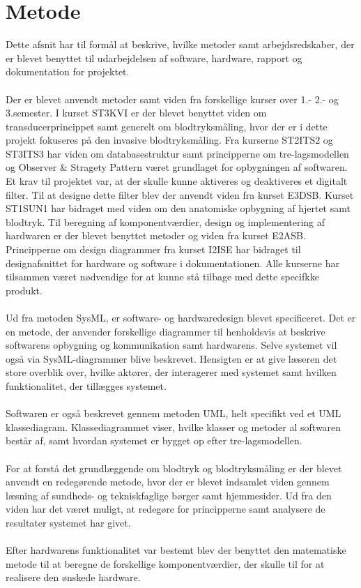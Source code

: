 \section{Metode}
Dette afsnit har til formål at beskrive, hvilke metoder samt arbejdsredskaber, der er blevet benyttet til udarbejdelsen af software, hardware, rapport og dokumentation for projektet. 
\\\\
Der er blevet anvendt metoder samt viden fra forskellige kurser over 1.- 2.- og 3.semester. I kurset ST3KVI er der blevet benyttet viden om transducerprincippet samt generelt om blodtryksmåling, hvor der er i dette projekt fokuseres på den invasive blodtryksmåling. Fra kurserne ST2ITS2 og ST3ITS3 har viden om databasestruktur samt principperne om tre-lagsmodellen og Observer \& Stragety Pattern været grundlaget for opbygningen af softwaren. Et krav til projektet var, at der skulle kunne aktiveres og deaktiveres et digitalt filter. Til at designe dette filter blev der anvendt viden fra kurset E3DSB. Kurset ST1SUN1 har bidraget med viden om den anatomiske opbygning af hjertet samt blodtryk. Til beregning af komponentværdier, design og implementering af hardwaren er der blevet benyttet metoder og viden fra kurset E2ASB. Principperne om design diagrammer fra kurset I2ISE har bidraget til designafsnittet for hardware og software i dokumentationen. Alle kurserne har tilsammen været nødvendige for at kunne stå tilbage med dette specifkke produkt.
\\\\
Ud fra metoden SysML, er software- og hardwaredesign blevet specificeret. Det er en metode, der anvender forskellige diagrammer til henholdsvis at beskrive softwarens opbygning og kommunikation samt hardwarens. Selve systemet vil også via SysML-diagrammer blive beskrevet. Hensigten er at give læseren det store overblik over, hvilke aktører, der interagerer med systemet samt hvilken funktionalitet, der tillægges systemet.
\\ \\
Softwaren er også beskrevet gennem metoden UML, helt specifikt ved et UML klassediagram. Klassediagrammet viser, hvilke klasser og metoder al softwaren består af, samt hvordan systemet er bygget op efter tre-lagsmodellen.
\\\\
For at forstå det grundlæggende om blodtryk og blodtryksmåling er der blevet anvendt en redegørende metode, hvor der er blevet indsamlet viden gennem læsning af sundheds- og tekniskfaglige børger samt hjemmesider. Ud fra den viden har det været muligt, at redegøre for principperne samt analysere de resultater systemet har givet.
\\\\
Efter hardwarens funktionalitet var bestemt blev der benyttet den matematiske metode til at beregne de forskellige komponentværdier, der skulle til for at realisere den ønskede hardware.

